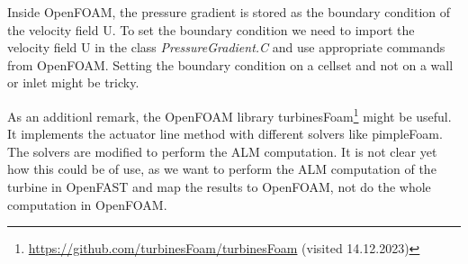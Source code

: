 Inside OpenFOAM, the pressure gradient is stored as the boundary condition of the velocity field U. To set the boundary condition we need to import the velocity field U in the class \textit{PressureGradient.C} and use appropriate commands from OpenFOAM. Setting the boundary condition on a cellset and not on a wall or inlet might be tricky.

As an additionl remark, the OpenFOAM library turbinesFoam\footnote{\url{https://github.com/turbinesFoam/turbinesFoam} (visited 14.12.2023)} \cite{Bachant:2018} might be useful. It implements the actuator line method with different solvers like pimpleFoam. The solvers are modified to perform the ALM computation. It is not clear yet how this could be of use, as we want to perform the ALM computation of the turbine in OpenFAST and map the results to OpenFOAM, not do the whole computation in OpenFOAM.

